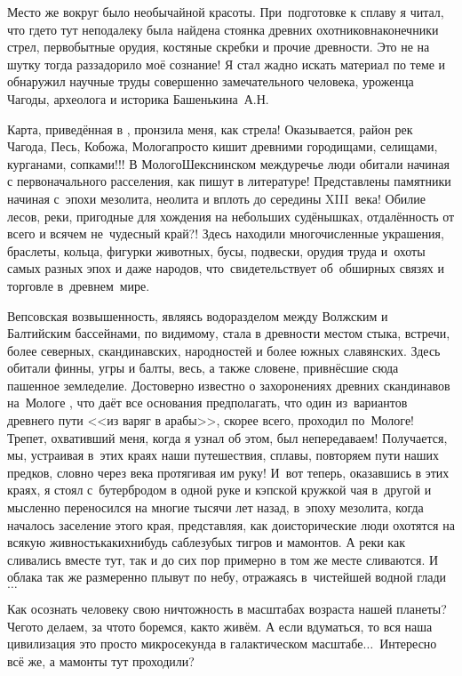 Место же вокруг было необычайной красоты. При~подготовке к сплаву я читал, что где\sdash то тут неподалеку была найдена стоянка древних охотников\mdash наконечники стрел, первобытные орудия, костяные скребки и прочие древности. Это не на шутку тогда раззадорило моё сознание! Я стал жадно искать материал по теме и обнаружил научные труды совершенно замечательного человека, уроженца Чагоды, археолога и историка Башенькина~А.Н. 

Карта, приведённая в \cite{БашенькинМологоШекснинскоеМеждуречье}, пронзила меня, как стрела! Оказывается, район рек Чагода, Песь, Кобожа, Молога\mdash просто кишит древними городищами, селищами, курганами, сопками!!! В Молого\sdash Шекснинском междуречье люди обитали начиная с первоначального расселения, как пишут в литературе! Представлены памятники начиная с~эпохи мезолита, неолита и вплоть до середины XIII~века! Обилие лесов, реки, пригодные для хождения на небольших судёнышках, отдалённость от всего и вся\mdash чем не~чудесный край?! Здесь находили многочисленные украшения, браслеты, кольца, фигурки животных, бусы, подвески, орудия труда и~охоты самых разных эпох и даже народов, что~свидетельствует об~обширных связях и торговле в~древнем~мире.

Вепсовская возвышенность, являясь водоразделом между Волжским и Балтийским бассейнами, по видимому, стала в древности местом стыка, встречи, более северных, скандинавских, народностей и более южных славянских. Здесь обитали финны, угры и балты, весь, а также словене, привнёсшие сюда пашенное земледелие. Достоверно известно о захоронениях древних скандинавов на~Мологе \cite{БашенькинМологоШекснинскоеМеждуречье}, что даёт все основания предполагать, что один из~вариантов древнего пути <<из варяг в арабы>>, скорее всего, проходил по~Мологе! Трепет, охвативший меня, когда я узнал об этом, был непередаваем! Получается, мы, устраивая в~этих краях наши путешествия, сплавы, повторяем пути наших предков, словно через века протягивая им руку!
\newpage
И~вот теперь, оказавшись в этих краях, я стоял с~бутербродом в одной руке и кэпской кружкой чая в~другой и мысленно переносился на многие тысячи лет назад, в~эпоху мезолита, когда началось заселение этого края, представляя, как доисторические люди охотятся на всякую живность\mdash каких\sdash нибудь саблезубых тигров и мамонтов. А реки как сливались вместе тут, так и до сих пор примерно в том же месте сливаются. И облака так же размеренно плывут по небу, отражаясь в~чистейшей водной глади$\ldots$

Как осознать человеку свою ничтожность в масштабах возраста нашей планеты? Чего\sdash то делаем, за что\sdash то боремся, как\sdash то живём. А если вдуматься, то вся наша цивилизация \mdash это просто микросекунда в галактическом масштабе$\ldots$~Интересно всё же, а мамонты тут проходили?

